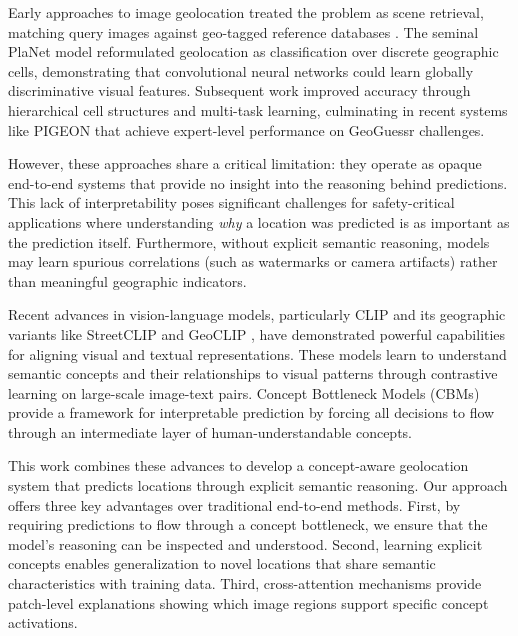 \documentclass{uva-inf-article}
\begin{document}
Early approaches to image geolocation treated the problem as scene retrieval, matching query images against geo-tagged reference databases \parencite{hays2008im2gps}. The seminal PlaNet model \parencite{weyand2016planet} reformulated geolocation as classification over discrete geographic cells, demonstrating that convolutional neural networks could learn globally discriminative visual features. Subsequent work improved accuracy through hierarchical cell structures \parencite{muller2018geolocation, seo2018cpl} and multi-task learning, culminating in recent systems like PIGEON \parencite{haas2024pigeon} that achieve expert-level performance on GeoGuessr challenges.

However, these approaches share a critical limitation: they operate as opaque end-to-end systems that provide no insight into the reasoning behind predictions. This lack of interpretability poses significant challenges for safety-critical applications where understanding \textit{why} a location was predicted is as important as the prediction itself. Furthermore, without explicit semantic reasoning, models may learn spurious correlations (such as watermarks or camera artifacts) rather than meaningful geographic indicators.

Recent advances in vision-language models, particularly CLIP \parencite{radford2021learning} and its geographic variants like StreetCLIP \parencite{streetclip2023} and GeoCLIP \parencite{cepeda2023geoclip}, have demonstrated powerful capabilities for aligning visual and textual representations. These models learn to understand semantic concepts and their relationships to visual patterns through contrastive learning on large-scale image-text pairs. Concept Bottleneck Models (CBMs) \parencite{koh2020concept} provide a framework for interpretable prediction by forcing all decisions to flow through an intermediate layer of human-understandable concepts.

This work combines these advances to develop a concept-aware geolocation system that predicts locations through explicit semantic reasoning. Our approach offers three key advantages over traditional end-to-end methods. First, by requiring predictions to flow through a concept bottleneck, we ensure that the model's reasoning can be inspected and understood. Second, learning explicit concepts enables generalization to novel locations that share semantic characteristics with training data. Third, cross-attention mechanisms provide patch-level explanations showing which image regions support specific concept activations.
\end{document}
